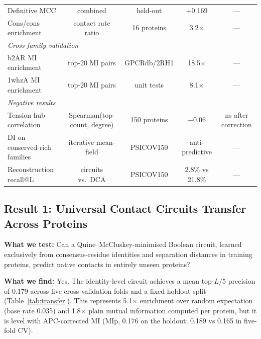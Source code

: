 \begin{table}[ht]
\begin{tabular}{p{2.8cm}cccc}
		Definitive MCC                & combined                      & held-out          & +0.169          & ---                   \\
		Cons/cons enrichment          & contact rate ratio            & 16 proteins       & 3.2$\times$     & ---                   \\
		\midrule
		\multicolumn{5}{l}{\textit{Cross-family validation}}                                                                        \\
		b2AR MI enrichment            & top-20 MI pairs               & GPCRdb/2RH1       & 18.5$\times$    & ---                   \\
		1whzA MI enrichment           & top-20 MI pairs               & unit tests        & 8.1$\times$     & ---                   \\
		\midrule
		\multicolumn{5}{l}{\textit{Negative results}}                                                                               \\
		Tension hub correlation       & Spearman(top-count, degree)   & 150 proteins      & $-0.06$         & ns after correction   \\
		DI on conserved-rich families & iterative mean-field          & PSICOV150         & anti-predictive & ---                   \\
		Reconstruction recall@L       & circuits vs.\ DCA             & PSICOV150         & 2.8\% vs 21.8\% & ---                   \\
		\bottomrule
	\end{tabular}
\end{table}

\subsection{Result 1: Universal Contact Circuits Transfer Across Proteins}

\textbf{What we test:} Can a Quine--McCluskey-minimised Boolean circuit,
learned exclusively from consensus-residue identities and separation distances
in training proteins, predict native contacts in entirely unseen proteins?

\textbf{What we find:} Yes.  The identity-level circuit achieves a mean
top-$L/5$ precision of 0.179 across five cross-validation folds and a fixed
holdout split (Table~\ref{tab:transfer}).  This represents 5.1$\times$
enrichment over random expectation (base rate 0.035) and 1.8$\times$ plain
mutual information computed per protein, but it is level with APC-corrected MI
(MIp, 0.176 on the holdout; 0.189 vs 0.165 in five-fold CV).

